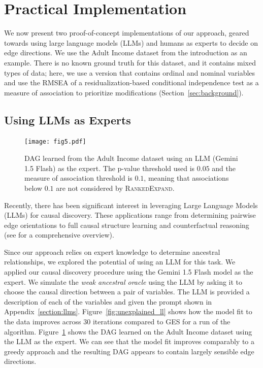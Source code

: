\documentclass[accepted]{uai2025} %
\begin{document}
\section{Practical Implementation}

\label{sec:web}

We now present two proof-of-concept implementations of our approach, 
geared towards using  large language models (LLMs) and humans as experts
to decide on edge directions. We use the Adult Income dataset from the 
introduction as an example. There is no known ground truth for this dataset,
and it contains mixed types of data; here, we use a version that contains
ordinal and nominal variables and use the RMSEA of a residualization-based
conditional independence test \citep{Ankan2023} as a measure of association
to prioritize modifications (Section~\ref{sec:background}). 

\subsection{Using LLMs as Experts}
 
\begin{figure}[t!]
	\centering
	\texttt{[image: fig5.pdf]}
	\caption{DAG learned from the Adult Income dataset using an LLM
		(Gemini 1.5 Flash) as the expert. The p-value threshold used is $ 0.05 $ 
		and the measure of association threshold is $ 0. 1 $, meaning
		that associations below $0.1$ are not considered by 
		\textsc{RankedExpand}.}
	\label{fig:adult_llm}
\end{figure}

Recently, there has been significant interest in leveraging Large Language
Models (LLMs) for causal discovery. These applications range from determining
pairwise edge orientations \citep{Kiciman2023, Jin2024} to full causal
structure learning \citep{Naik2023, Vashishtha2023} and counterfactual
reasoning \citep{Kiciman2023} (see \citet{Liu2024} for a comprehensive
overview).

Since our approach relies on expert knowledge to determine ancestral relationships,
we explored the potential of using an LLM for this task. We applied our causal
discovery procedure using the Gemini 1.5 Flash model as the expert. We simulate
the \emph{weak ancestral oracle} using the LLM by asking it to choose the
causal direction between a pair of variables. The LLM is provided a description
of each of the variables and given the prompt shown in
Appendix~\ref{section:llms}. 
Figure~\ref{fig:unexplained_ll} shows how the model fit to the data improves 
across 30 iterations compared to GES for a run of the algorithm.
Figure~\ref{fig:adult_llm} shows the DAG learned
on the Adult Income dataset using the LLM as the expert. We can see 
that the model fit improves comparably to a greedy approach and 
the resulting DAG appears to contain largely sensible edge directions. 
\end{document}
